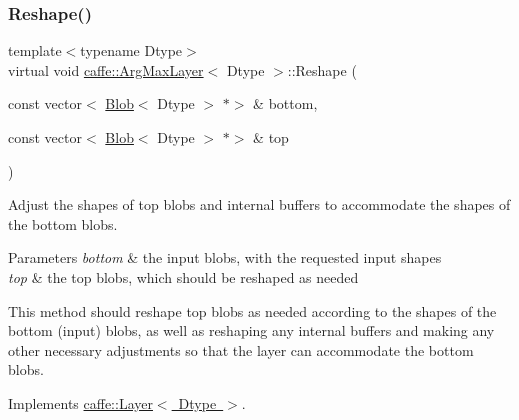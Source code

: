 \subsubsection{\texorpdfstring{Reshape()}{Reshape()}\hspace{0.1cm}{\footnotesize\ttfamily [1/2]}}
{\footnotesize\ttfamily template$<$typename Dtype$>$ \\
virtual void \mbox{\hyperlink{classcaffe_1_1_arg_max_layer}{caffe\+::\+Arg\+Max\+Layer}}$<$ Dtype $>$\+::Reshape (\begin{DoxyParamCaption}\item[{const vector$<$ \mbox{\hyperlink{classcaffe_1_1_blob}{Blob}}$<$ Dtype $>$ $\ast$$>$ \&}]{bottom,  }\item[{const vector$<$ \mbox{\hyperlink{classcaffe_1_1_blob}{Blob}}$<$ Dtype $>$ $\ast$$>$ \&}]{top }\end{DoxyParamCaption})\hspace{0.3cm}{\ttfamily [virtual]}}



Adjust the shapes of top blobs and internal buffers to accommodate the shapes of the bottom blobs. 


\begin{DoxyParams}{Parameters}
{\em bottom} & the input blobs, with the requested input shapes \\
\hline
{\em top} & the top blobs, which should be reshaped as needed\\
\hline
\end{DoxyParams}
This method should reshape top blobs as needed according to the shapes of the bottom (input) blobs, as well as reshaping any internal buffers and making any other necessary adjustments so that the layer can accommodate the bottom blobs. 

Implements \mbox{\hyperlink{classcaffe_1_1_layer_a7fe981e8af8d93d587acf2a952be563d}{caffe\+::\+Layer$<$ Dtype $>$}}.

\mbox{\label{classcaffe_1_1_arg_max_layer_a291a2c548c28e7ab02ddac0cfd3cbdad}} 
